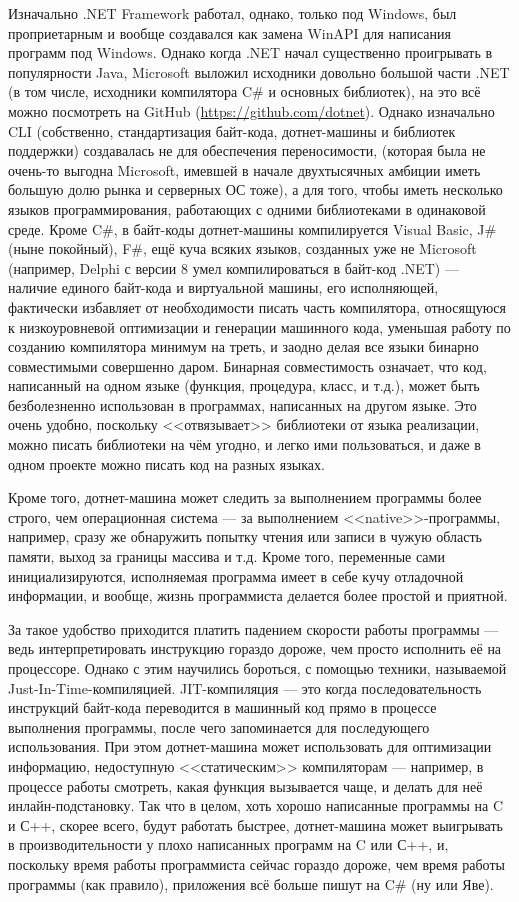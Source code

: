 \documentclass{../../text-style}
\begin{document}
Изначально .NET Framework работал, однако, только под Windows, был проприетарным и вообще создавался как замена WinAPI для написания программ под Windows. Однако когда .NET начал существенно проигрывать в популярности Java, Microsoft выложил исходники довольно большой части .NET (в том числе, исходники компилятора C\# и основных библиотек), на это всё можно посмотреть на GitHub (\url{https://github.com/dotnet}). Однако изначально CLI (собственно, стандартизация байт-кода, дотнет-машины и библиотек поддержки) создавалась не для обеспечения переносимости, (которая была не очень-то выгодна Microsoft, имевшей в начале двухтысячных амбиции иметь большую долю рынка и серверных ОС тоже), а для того, чтобы иметь несколько языков программирования, работающих с одними библиотеками в одинаковой среде. Кроме C\#, в байт-коды дотнет-машины компилируется Visual Basic, J\# (ныне покойный), F\#, ещё куча всяких языков, созданных уже не Microsoft (например, Delphi с версии 8 умел компилироваться в байт-код .NET) --- наличие единого байт-кода и виртуальной машины, его исполняющей, фактически избавляет от необходимости писать часть компилятора, относящуюся к низкоуровневой оптимизации и генерации машинного кода, уменьшая работу по созданию компилятора минимум на треть, и заодно делая все языки бинарно совместимыми совершенно даром. Бинарная совместимость означает, что код, написанный на одном языке (функция, процедура, класс, и т.д.), может быть безболезненно использован в программах, написанных на другом языке. Это очень удобно, поскольку <<отвязывает>> библиотеки от языка реализации, можно писать библиотеки на чём угодно, и легко ими пользоваться, и даже в одном проекте можно писать код на разных языках. 

Кроме того, дотнет-машина может следить за выполнением программы более строго, чем операционная система --- за выполнением <<native>>-программы, например, сразу же обнаружить попытку чтения или записи в чужую область памяти, выход за границы массива и т.д. Кроме того, переменные сами инициализируются, исполняемая программа имеет в себе кучу отладочной информации, и вообще, жизнь программиста делается более простой и приятной.

За такое удобство приходится платить падением скорости работы программы --- ведь интерпретировать инструкцию гораздо дороже, чем просто исполнить её на процессоре. Однако с этим научились бороться, с помощью техники, называемой Just-In-Time-компиляцией. JIT-компиляция --- это когда последовательность инструкций байт-кода переводится в машинный код прямо в процессе выполнения программы, после чего запоминается для последующего использования. При этом дотнет-машина может использовать для оптимизации информацию, недоступную <<статическим>> компиляторам --- например, в процессе работы смотреть, какая функция вызывается чаще, и делать для неё инлайн-подстановку. Так что в целом, хоть хорошо написанные программы на C и С++, скорее всего, будут работать быстрее, дотнет-машина может выигрывать в производительности у плохо написанных программ на C или С++, и, поскольку время работы программиста сейчас гораздо дороже, чем время работы программы (как правило), приложения всё больше пишут на C\# (ну или Яве).
\end{document}
